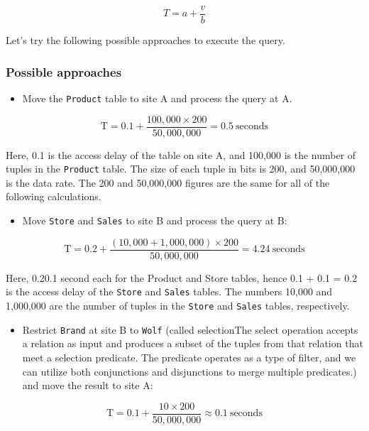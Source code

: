 \[
T = a + \frac{v}{b}
\]

Let's try the following possible approaches to execute the query.

\subsubsection{Possible approaches}\label{5qVBl3nAwX0STNMPMwD4H}

\begin{itemize}
\item
\protect{}\label{G38WxQ4QlAUKGjZV5l1wt}
Move the \texttt{Product} table to site A and process the query at A.
\end{itemize}

\[
\text{T} = 0.1 + \frac{100,000 \times 200}{50,000,000} = 0.5 \ \text{seconds}
\]

Here, 0.1 is the access delay of the table on site A, and 100,000 is the number of tuples in the \texttt{Product} table. The size of each tuple in bits is 200, and 50,000,000 is the data rate. The 200 and 50,000,000 figures are the same for all of the following calculations.

\begin{itemize}
\item
\protect{}\label{1YqIFP3qr5emOkE9RPS-u}
Move \texttt{Store} and \texttt{Sales} to site B and process the query at B:
\end{itemize}

\[
\text{T} = 0.2 + \frac{(10,000 + 1,000,000) \times 200}{50,000,000} = 4.24 \ \text{seconds}
\]

Here, 0.20.1 second each for the Product and Store tables, hence 0.1 + 0.1 = 0.2 is the access delay of the \texttt{Store} and \texttt{Sales} tables. The numbers 10,000 and 1,000,000 are the number of tuples in the \texttt{Store} and \texttt{Sales} tables, respectively.

\begin{itemize}
\item
\protect{}\label{eh7pHTOeTfCiznIaURPNb}
Restrict \texttt{Brand} at site B to \texttt{Wolf} (called selectionThe select operation accepts a relation as input and produces a subset of the tuples from that relation that meet a selection predicate. The predicate operates as a type of filter, and we can utilize both conjunctions and disjunctions to merge multiple predicates.) and move the result to site A:
\end{itemize}

\[
\text{T} = 0.1 + \frac{10 \times 200}{50,000,000} \approx 0.1 \ \text{seconds}
\]

